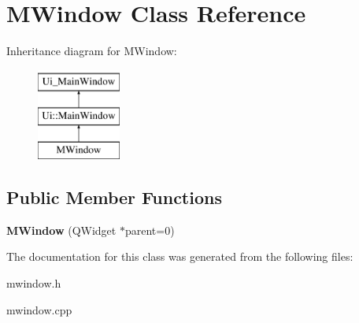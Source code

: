 \hypertarget{class_m_window}{
\section{MWindow Class Reference}
\label{class_m_window}
}
Inheritance diagram for MWindow:\begin{figure}[H]
\begin{center}
\leavevmode
\includegraphics[height=3.000000cm]{class_m_window}
\end{center}
\end{figure}
\subsection*{Public Member Functions}
\begin{DoxyCompactItemize}
\item 
\hypertarget{class_m_window_abc4fd19ed9f1169de92322fcad7442fe}{
{\bfseries MWindow} (QWidget $\ast$parent=0)}
\label{class_m_window_abc4fd19ed9f1169de92322fcad7442fe}

\end{DoxyCompactItemize}


The documentation for this class was generated from the following files:\begin{DoxyCompactItemize}
\item 
mwindow.h\item 
mwindow.cpp\end{DoxyCompactItemize}
